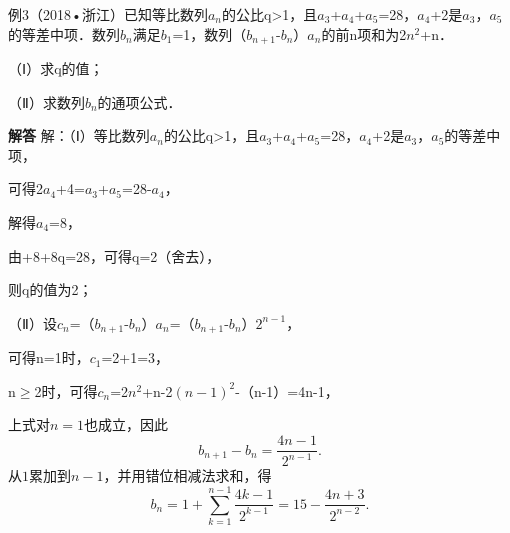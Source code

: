 例3（2018•浙江）已知等比数列{\ensuremath{a_{n}}}的公比q>1，且\ensuremath{a_{3}}+\ensuremath{a_{4}}+\ensuremath{a_{5}}=28，\ensuremath{a_{4}}+2是\ensuremath{a_{3}}，\ensuremath{a_{5}}的等差中项．数列{\ensuremath{b_{n}}}满足\ensuremath{b_{1}}=1，数列{（\ensuremath{b_{n+1}}-\ensuremath{b_{n}}）\ensuremath{a_{n}}}的前n项和为2\ensuremath{n^{2}}+n．\par
（Ⅰ）求q的值；\par
（Ⅱ）求数列{\ensuremath{b_{n}}}的通项公式．\par
\QuestionSpace{4.8cm}
\ifshowanswers
\par\begingroup\color{solutioncolor}\noindent\textbf{解答}\quad
解：（Ⅰ）等比数列{\ensuremath{a_{n}}}的公比q>1，且\ensuremath{a_{3}}+\ensuremath{a_{4}}+\ensuremath{a_{5}}=28，\ensuremath{a_{4}}+2是\ensuremath{a_{3}}，\ensuremath{a_{5}}的等差中项，\par
可得2\ensuremath{a_{4}}+4=\ensuremath{a_{3}}+\ensuremath{a_{5}}=28-\ensuremath{a_{4}}，\par
解得\ensuremath{a_{4}}=8，\par
由+8+8q=28，可得q=2（舍去），\par
则q的值为2；\par
（Ⅱ）设\ensuremath{c_{n}}=（\ensuremath{b_{n+1}}-\ensuremath{b_{n}}）\ensuremath{a_{n}}=（\ensuremath{b_{n+1}}-\ensuremath{b_{n}}）\ensuremath{2^{n-1}}，\par
可得n=1时，\ensuremath{c_{1}}=2+1=3，\par
n\ensuremath{\ge}2时，可得\ensuremath{c_{n}}=2\ensuremath{n^{2}}+n-2\ensuremath{(n-1)^{2}}-（n-1）=4n-1，\par
上式对$n=1$也成立，因此
\[
b_{n+1}-b_n=\frac{4n-1}{2^{n-1}}.
\]
从$1$累加到$n-1$，并用错位相减法求和，得
\[
b_n=1+\sum_{k=1}^{n-1}\frac{4k-1}{2^{k-1}}
=\boxed{15-\frac{4n+3}{2^{n-2}}}.
\]
\par\endgroup\fi

